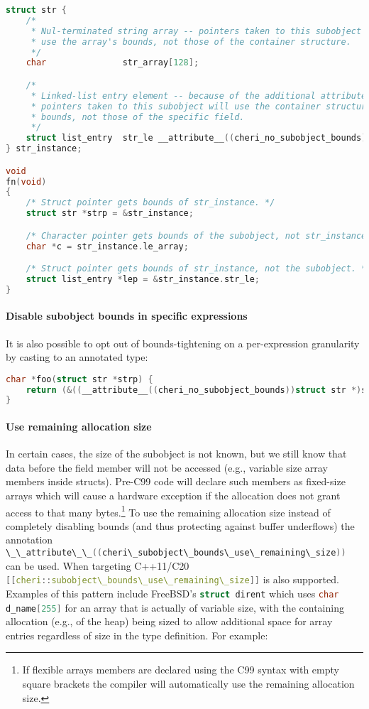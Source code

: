 \documentclass[11pt]{article}
\newcommand{\ccode}[1]{\lstinline[language={C},basicstyle=\small\ttfamily]{#1}}
\newcommand{\cxxcode}[1]{\lstinline[language={C++}]{#1}}
\begin{document}
\begin{lstlisting}[language={C}]
struct str {
    /*
     * Nul-terminated string array -- pointers taken to this subobject will
     * use the array's bounds, not those of the container structure.
     */
    char               str_array[128];

    /*
     * Linked-list entry element -- because of the additional attribute,
     * pointers taken to this subobject will use the container structure's
     * bounds, not those of the specific field.
     */
    struct list_entry  str_le __attribute__((cheri_no_subobject_bounds));
} str_instance;

void
fn(void)
{
    /* Struct pointer gets bounds of str_instance. */
    struct str *strp = &str_instance;

    /* Character pointer gets bounds of the subobject, not str_instance. */
    char *c = str_instance.le_array;

    /* Struct pointer gets bounds of str_instance, not the subobject. */
    struct list_entry *lep = &str_instance.str_le;
}
\end{lstlisting}

\paragraph{Disable subobject bounds in specific expressions}
It is also possible to opt out of bounds-tightening on a per-expression
granularity by casting to an annotated type:

\begin{lstlisting}[language={C}]
char *foo(struct str *strp) {
    return (&((__attribute__((cheri_no_subobject_bounds))struct str *)strp)->str_array);
}
\end{lstlisting}

\paragraph{Use remaining allocation size}
In certain cases, the size of the subobject is not known, but we still know that data
before the field member will not be accessed (e.g., variable size array members
inside structs).
Pre-C99 code will declare such members as fixed-size arrays which will cause
a hardware exception if the allocation does not grant access to that many bytes.\footnote{%
If flexible arrays members are declared using the C99 syntax with empty square
brackets the compiler will automatically use the remaining allocation size.}
To use the remaining allocation size instead of completely disabling bounds
(and thus protecting against buffer underflows) the annotation
\ccode{\_\_attribute\_\_((cheri\_subobject\_bounds\_use\_remaining\_size))} can be used.
When targeting C++11/C20 \cxxcode{[[cheri::subobject\_bounds\_use\_remaining\_size]]}
is also supported.
Examples of this pattern include FreeBSD's \ccode{struct dirent} which uses
\ccode{char d_name[255]} for an array that is actually of variable size, with
the containing allocation (e.g., of the heap) being sized to allow additional
space for array entries regardless of size in the type definition.
For example:
\end{document}
